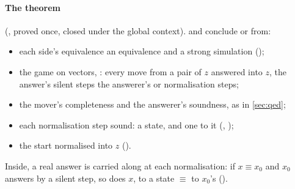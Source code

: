 \paragraph{The theorem} (, proved once, closed
under the global context).  and
 conclude  or
 from:
\begin{itemize}
\item each side's equivalence  an equivalence and a strong
  simulation ();
\item the game on vectors, : every move from a pair of $z$
  answered into $z$, the answer's silent steps the answerer's or
  normalisation steps;
\item the mover's completeness and the answerer's soundness, as in
  \cref{sec:qed};
\item each normalisation step sound: a state, and one  to it
  (, );
\item the start normalised into $z$ ().
\end{itemize}
Inside, a real answer is carried along  at each normalisation:
if $x \equiv x_0$ and $x_0$ answers by a silent step, so does $x$, to a
state $\equiv$ to $x_0$'s ().

